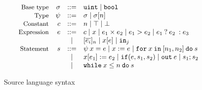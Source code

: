 \begin{figure}
  \small
  \[
  \begin{array}{rrcl}
    \text{\small{Base type}} & \sigma &::=& {\mathtt{uint}} \mid {\ensuremath{\mathtt{bool}}}\\
    \text{\small{Type}} & \psi &::=& \sigma \mid \sigma[n]\\
    \text{\small{Constant}} & c &::=& n \mid \top \mid \bot\\
    \text{\small{Expression}} & e &::=& c \mid x \mid e_{1} \times e_{2} \mid e_{1} > e_{2} \mid {{e_{1}}\:?\:{e_{2}}\::{e_{3}}}\\
    & &\mid& [\overline{e_{i}}]_{n} \mid x[e] \mid {\ensuremath{\mathtt{in}}}_{j}\\
    \text{\small{Statement}} & s &::=& \psi\:x = e \mid x := e \mid {\ensuremath{\mathtt{for}}}\:{x}\:{\mathtt{in}}\:[{n_{1}}, {n_{2}}]\:{\mathtt{do}}\:{s}\\
    & & \mid& x[e_{1}] := e_{2} \mid {\ensuremath{\mathtt{if}}}({e}, {s_{1}}, {s_{2}}) \mid {\ensuremath{\mathtt{out}}}\:e \mid s_{1}; s_{2}\\
    & & \mid& {\mathtt{while}}\:{x} \leq {n}\:{\mathtt{do}}\:{s}
  \end{array}
  \]
\caption{Source language syntax}
\label{fig:srclang}
\end{figure}

